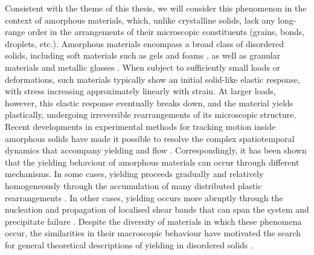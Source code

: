 \documentclass[asymmetricmargins]{library/duthesis}%
\begin{document}
Consistent with the theme of this thesis, we will consider this phenomenon in the context of amorphous materials, which, unlike crystalline solids, lack any long-range order in the arrangements of their microscopic constituents (grains, bonds, droplets, etc.). Amorphous materials \cite{nicolas_deformation_2018,Berthier2011,Berthier2025} encompass a broad class of disordered solids, including soft materials such as gels and foams \cite{bonn_yield_2017}, as well as granular materials \cite{liuJammingNotJust1998} and metallic glasses \cite{SCHUH2007}. When subject to sufficiently small loads or deformations, such materials typically show an initial solid-like elastic response, with stress increasing approximately linearly with strain. At larger loads, however, this elastic response eventually breaks down, and the material yields plastically, undergoing irreversible rearrangements of its microscopic structure. Recent developments in experimental methods for tracking motion inside amorphous solids have made it possible to resolve the complex spatiotemporal dynamics that accompany yielding and flow \cite{porr_probing_2025,manneville_recent_2008,Besseling2009,Dutta2013,divoux_stress_2011,divouxTransientShearBanding2010,divoux_yielding_2012,grenard_timescales_2014,gibaud_heterogeneous_2010,kurokawa_avalanche-like_2015,Chan2013,Schott2025,Zhang2025,Shang2024,Aime2025}. Correspondingly, it has been shown that the yielding behaviour of amorphous materials can occur through different mechanisms. In some cases, yielding proceeds gradually and relatively homogeneously through the accumulation of many distributed plastic rearrangements \cite{Malandro1999,pollard_yielding_2022,falk_dynamics_1998,divoux_stress_2011,divoux_yielding_2012,divouxTransientShearBanding2010,grenard_timescales_2014,Gibaud2009,gibaud_heterogeneous_2010,kurokawa_avalanche-like_2015,Sentjabrskaja2015}. In other cases, yielding occurs more abruptly through the nucleation and propagation of localised shear bands that can span the system and precipitate failure \cite{divoux_stress_2011,pollard_yielding_2022,SCHUH2007,barlow_ductile_2020,Huang2016,bonnDelayedFractureInhomogeneous1998,leocmach_creep_2014,Tabuteau2009,fieldingTriggersSignaturesShear2016}. Despite the diversity of materials in which these phenomena occur, the similarities in their macroscopic behaviour have motivated the search for general theoretical descriptions of yielding in disordered solids \cite{cabriolu_precursors_2019}. 
\end{document}
